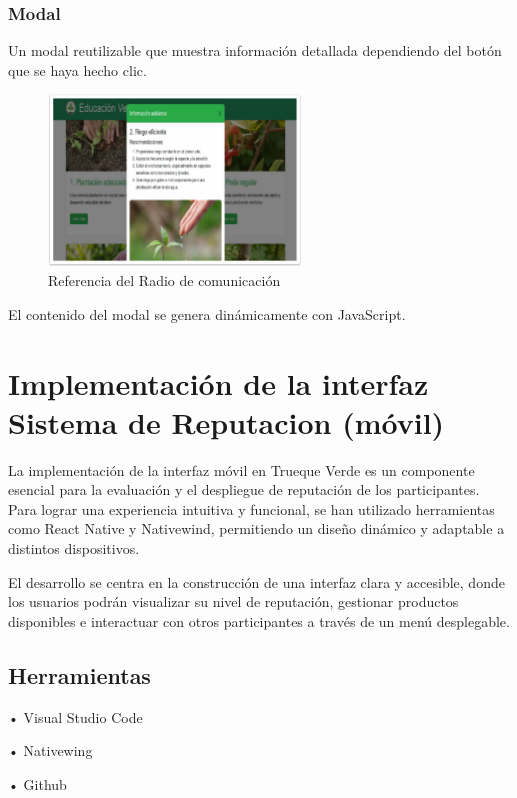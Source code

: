 \documentclass[11pt, a4paper, oneside]{book}
\begin{document}
\subsection {Modal}
Un modal reutilizable que muestra información detallada dependiendo del botón que se haya hecho clic.
\begin{figure}[H]
\centering
\includegraphics[width=0.6\textwidth]{Pictures/modal.png}
\caption{Referencia del Radio de comunicación}
\end{figure}

El contenido del modal se genera dinámicamente con JavaScript.



\chapter{Implementación de la interfaz Sistema de Reputacion (móvil)} 

La implementación de la interfaz móvil en Trueque Verde es un componente esencial para la evaluación y el despliegue de reputación de los participantes. Para lograr una experiencia intuitiva y funcional, se han utilizado herramientas como React Native y Nativewind, permitiendo un diseño dinámico y adaptable a distintos dispositivos.
\hspace{2cm}

El desarrollo se centra en la construcción de una interfaz clara y accesible, donde los usuarios podrán visualizar su nivel de reputación, gestionar productos disponibles e interactuar con otros participantes a través de un menú desplegable.


\section{Herramientas}

•	Visual Studio Code

•	Nativewing

•	Github
\end{document}
